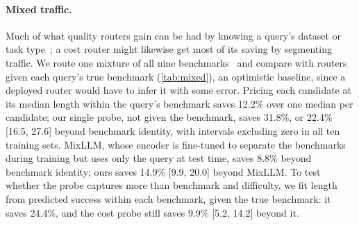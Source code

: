 \documentclass[10pt]{article}
\begin{document}
\paragraph{Mixed traffic.}
Much of what quality routers gain can be had by knowing a query's dataset or task type~\citep{llmrouterbench,tasktype}; a cost router might likewise get most of its saving by segmenting traffic. We route one mixture of all nine benchmarks~\citep{routerbench,llmrouterbench} and compare with routers given each query's true benchmark (\cref{tab:mixed}), an optimistic baseline, since a deployed router would have to infer it with some error. Pricing each candidate at its median length within the query's benchmark saves 12.2\% over one median per candidate; our single probe, not given the benchmark, saves 31.8\%, or 22.4\% [16.5, 27.6] beyond benchmark identity, with intervals excluding zero in all ten training sets. MixLLM, whose encoder is fine-tuned to separate the benchmarks during training but uses only the query at test time, saves 8.8\% beyond benchmark identity; ours saves 14.9\% [9.9, 20.0] beyond MixLLM. To test whether the probe captures more than benchmark and difficulty, we fit length from predicted success within each benchmark, given the true benchmark: it saves 24.4\%, and the cost probe still saves 9.9\% [5.2, 14.2] beyond it.
\end{document}
